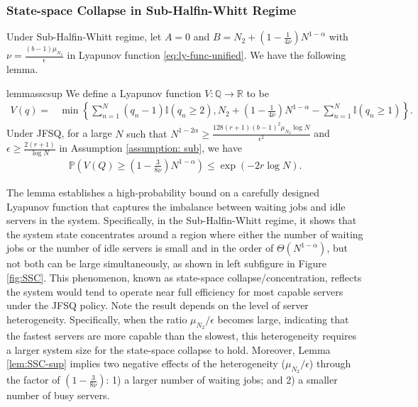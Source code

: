 \documentclass[11pt,oneside,letter]{article}
\begin{document}
\subsubsection*{State-space Collapse in Sub-Halfin-Whitt Regime} 
Under Sub-Halfin-Whitt regime, let $A= 0$ and $B= N_2 + (1-\frac{1}{4\nu})N^{1-\alpha}$ with $\nu = \frac{(b-1)\mu_{N_2}}{\epsilon}$ in Lyapunov function \eqref{eq:ly-func-unified}. 
We have the following lemma. 
\begin{restatable}{lemma}{sscsup}\label{lem:SSC-sup}
 We define a Lyapunov function $V: \mathbb Q \to \mathbb R$ to be
\begin{align}
V(q)=&\min\left\{\sum_{n=1}^{N} (q_n-1)\mathbb{I}(q_n\geq 2), N_2 + (1-\frac{1}{4\nu})N^{1-\alpha}  - \sum_{n=1}^{N} \mathbb{I}(q_n\geq 1) \right\}. \label{ly-func-sub}
\end{align}
Under JFSQ, for a large $N$ {such that $N^{1-2\alpha} \geq \frac{128(r+1)(b-1)^2\mu_{N_2}\log N}{\epsilon^2}$} and $\epsilon \geq \frac{2(r+1)}{\log N}$ in Assumption \ref{assumption: sub}, we have 
\begin{align*}
\mathbb P\left(V(Q)\geq (1-\frac{3}{8\nu}) N^{1-\alpha}\right)\leq  \exp\left(-2r\log N\right).
\end{align*}
\end{restatable}
The lemma establishes a high-probability bound on a carefully designed Lyapunov function that captures the imbalance between waiting jobs and idle servers in the system. Specifically, in the Sub-Halfin-Whitt regime, it shows that the system state concentrates around a region where either the number of waiting jobs or the number of idle servers is small and in the order of $\Theta(N^{1-\alpha})$, but not both can be large simultaneously, as shown in left subfigure in Figure \ref{fig:SSC}. This phenomenon, known as state-space collapse/concentration, reflects the system would tend to operate near full efficiency for most capable servers under the JFSQ policy. Note
the result depends on the level of server heterogeneity. Specifically, when the ratio $\mu_{N_2} / \epsilon$ becomes large, indicating that the fastest servers are more capable than the slowest, this heterogeneity requires a larger system size for the state-space collapse to hold. Moreover, Lemma \ref{lem:SSC-sup} implies two negative effects of the heterogeneity ($\mu_{N_2} / \epsilon$) through the factor of $(1-\frac{3}{8\nu})$: 1) a larger number of waiting jobs; and 2) a smaller number of busy servers.  
\end{document}
